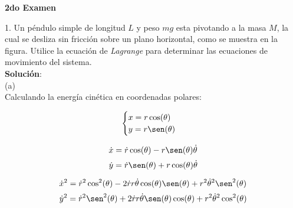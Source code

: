 \documentclass[letter,11pt]{article}
\begin{document}
\begin{center}
    {\large \bf{2do Examen}}
\end{center}

\noindent{}

\vspace{1.0cm}

1. Un péndulo simple de longitud $L$ y peso $mg$ esta pivotando a la masa $M$,
la cual se desliza sin fricción sobre un plano horizontal, como se muestra en la
figura. Utilice la ecuación de \emph{Lagrange} para determinar las ecuaciones de
movimiento del sistema.\\


\textbf{Solución}: \\

(a) \\

Calculando la energía cinética en coordenadas polares:

\begin{equation*}
    \begin{cases}
        x=r\cos(\theta)\\
        y=r\sen(\theta)
    \end{cases}
\end{equation*}

\begin{equation*}
    \dot{x}=\dot{r}\cos(\theta)-r\sen(\theta)\dot{\theta}
\end{equation*}
\begin{equation*}
    \dot{y}=\dot{r}\sen(\theta)+r\cos(\theta)\dot{\theta}
\end{equation*}

\begin{equation*}
    \dot{x}^2=\dot{r}^2\cos^2(\theta)
             -2\dot{r}r\dot{\theta}\cos(\theta)\sen(\theta)
             +r^2\dot{\theta}^2\sen^2(\theta)
\end{equation*}
\begin{equation*}
    \dot{y}^2=\dot{r}^2\sen^2(\theta)
             +2\dot{r}r\dot{\theta}\sen(\theta)\cos(\theta)
             +r^2\dot{\theta}^2\cos^2(\theta)
\end{equation*}
\end{document}
